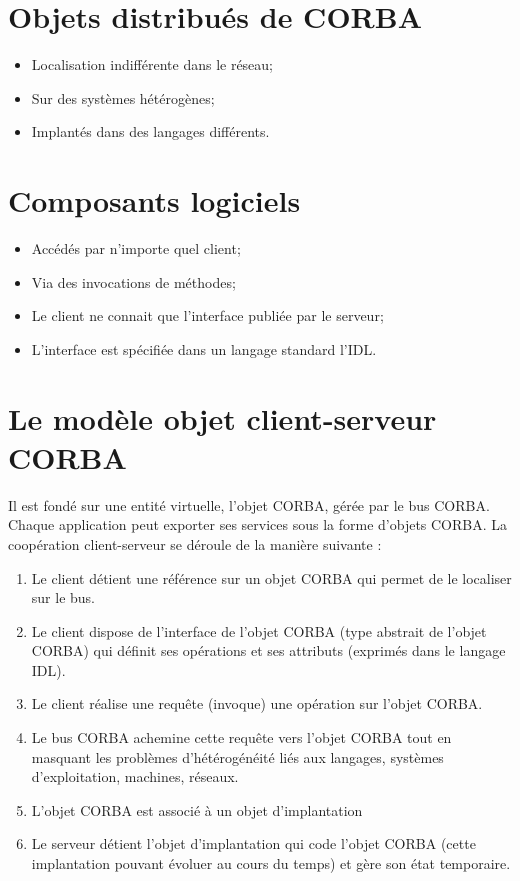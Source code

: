     \section{Objets distribués de CORBA}

        \begin{itemize}
            \item  Localisation indifférente dans le réseau;
            \item Sur des systèmes hétérogènes;
            \item Implantés dans des langages différents.
        \end{itemize}
\pagebreak
    
    \section{Composants logiciels}

        \begin{itemize}
            \item  Accédés par n'importe quel client;
            \item Via des invocations de méthodes;
            \item Le client ne connait que l'interface publiée par le serveur;
            \item L'interface est spécifiée dans un langage standard l'IDL.
        \end{itemize}

    \section{Le modèle objet client-serveur CORBA}

    Il est fondé sur une entité virtuelle, l'objet CORBA, gérée par le bus CORBA. Chaque application peut exporter ses services sous la forme d'objets CORBA.
    La coopération client-serveur se déroule de la manière suivante :
    \begin{enumerate}
        \item  Le client détient une référence sur un objet CORBA qui permet de le localiser sur le bus.
        \item Le client dispose de l'interface de l'objet CORBA (type abstrait de l'objet CORBA) qui définit ses opérations et ses attributs (exprimés dans le langage IDL).
        \item Le client réalise une requête (invoque) une opération sur l'objet CORBA.
        \item Le bus CORBA achemine cette requête vers l'objet CORBA tout en masquant les problèmes d'hétérogénéité liés aux langages, systèmes d'exploitation, machines, réseaux.
        \item L'objet CORBA est associé à un objet d'implantation
        \item Le serveur détient l'objet d'implantation qui code l'objet CORBA (cette implantation pouvant évoluer au cours du temps) et gère son état temporaire.
    \end{enumerate}
    \vfill

